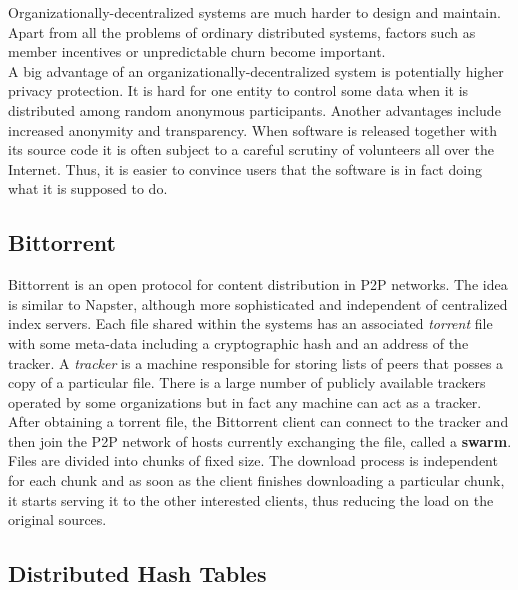 \documentclass{pracamgren}
\begin{document}
Organizationally-decentralized systems are much harder to design and maintain. Apart from all the problems of ordinary distributed systems, factors such as member incentives or unpredictable churn become important.\\

A big advantage of an organizationally-decentralized system is potentially higher privacy protection. It is hard for one entity to control some data when it is distributed among random anonymous participants.
Another advantages include increased anonymity and transparency. When software is released together with its source code it is often subject to a careful scrutiny of volunteers all over the Internet. Thus, it is easier to convince users that the software is in fact doing what it is supposed to do.\\

\subsection{Bittorrent}

Bittorrent \cite{bittorrent} is an open protocol for content distribution in P2P networks. The idea is similar to Napster, although more sophisticated and independent of centralized index servers. Each file shared within the systems has an associated {\it torrent} file with some meta-data including a cryptographic hash and an address of the tracker. A {\it tracker} is a machine responsible for storing lists of peers that posses a copy of a particular file. There is a large number of publicly available trackers operated by some organizations but in fact any machine can act as a tracker.\\

After obtaining a torrent file, the Bittorrent client can connect to the tracker and then join the P2P network of hosts currently exchanging the file, called a {\bf swarm}. Files are divided into chunks of fixed size. The download process is independent for each chunk and as soon as the client finishes downloading a particular chunk, it starts serving it to the other interested clients, thus reducing the load on the original sources.\\

\subsection{Distributed Hash Tables}
\end{document}
